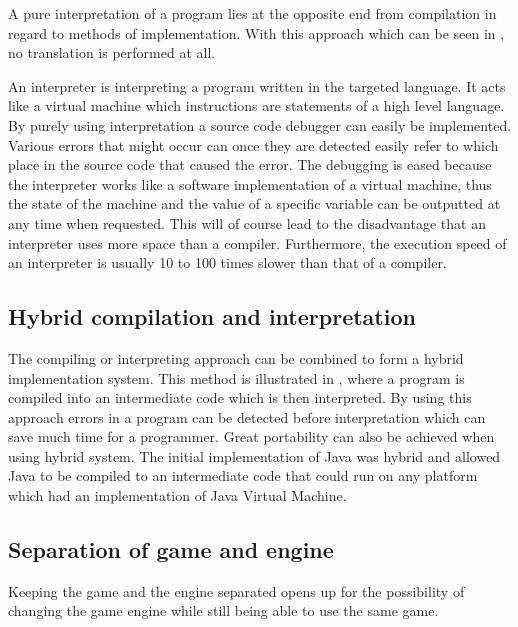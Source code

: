 A pure interpretation of a program lies at the opposite end from compilation in
regard to methods of implementation. With this approach which can be seen in
, no translation is performed at all.



An interpreter is interpreting a program written in the targeted language. It
acts like a virtual machine which instructions are statements of a high level
language. By purely using interpretation a source code debugger can easily be
implemented. Various errors that might occur can once they are detected easily
refer to which place in the source code that caused the error. The debugging is
eased because the interpreter works like a software implementation of a virtual
machine, thus the state of the machine and the value of a specific variable can
be outputted at any time when requested. This will of course lead to the
disadvantage that an interpreter uses more space than a compiler. Furthermore,
the execution speed of an interpreter is usually 10 to 100 times slower than
that of a compiler.
\cite[p. 48]{sebesta2013}

\subsection{Hybrid compilation and interpretation}
The compiling or interpreting approach can be combined to form a hybrid
implementation system. This method is illustrated in
, where a program is compiled into an
intermediate code which is then interpreted. By using this approach errors in a
program can be detected before interpretation which can save much time for a
programmer. Great portability can also be achieved when using hybrid system.
The initial implementation of Java was hybrid and allowed Java to be compiled to
an intermediate code that could run on any platform which had an implementation
of Java Virtual Machine.
\cite[p. 50]{sebesta2013}



\subsection{Separation of game and engine}
\label{subsec:engineseperation}
Keeping the game and the engine separated opens up for the possibility of
changing the game engine while still being able to use the same game. 


